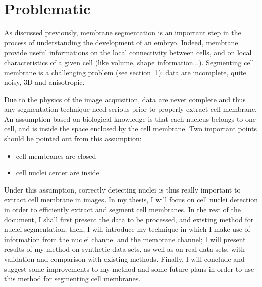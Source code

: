 \section{Problematic}


As discussed previously, membrane segmentation is an important step in the process of understanding the development of an embryo.
Indeed, membrane provide useful informations on the local connectivity between cells, and on local characteristics of a given cell (like volume, shape information...).
Segmenting cell membrane is a challenging problem (see section~\ref{}): data are incomplete, quite noisy, 3D and anisotropic.

Due to the physics of the image acquisition, data are never complete and thus any segmentation technique need serious prior to properly extract cell membrane.
An assumption based on biological knowledge is that each nucleus belongs to one cell, and is inside the space enclosed by the cell membrane.
Two important points should be pointed out from this assumption:
\begin{itemize}
    \item cell membranes are closed
    \item cell nuclei center are inside
\end{itemize}

Under this assumption, correctly detecting nuclei is thus really important to extract cell membrane in images.
In my thesis, I will focus on cell nuclei detection in order to efficiently extract and segment cell membranes.
In the rest of the document, I shall first present the data to be processed, and existing method for nuclei segmentation;
then, I will introduce my technique in which I make use of information from the nuclei channel and the membrane channel;
I will present results of my method on synthetic data sets, as well as on real data sets, with validation and comparison with existing methods.
Finally, I will conclude and suggest some improvements to my method and some future plans in order to use this method for segmenting cell membranes. 
